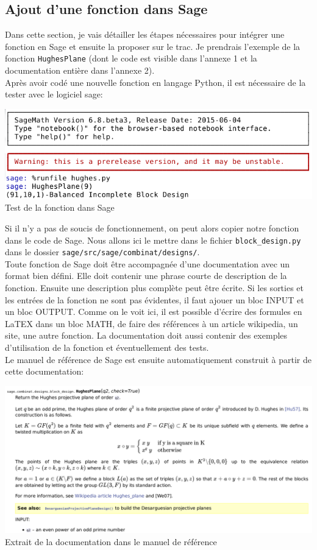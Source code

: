 \documentclass[a4paper]{article}
\begin{document}
\subsection{Ajout d'une fonction dans Sage}
Dans cette section, je vais détailler les étapes nécessaires pour intégrer une fonction en Sage et ensuite la proposer sur le trac. Je prendrais l'exemple de la fonction \texttt{HughesPlane} (dont le code est visible dans l'annexe 1 et la documentation entière dans l'annexe 2).\bigskip\\ 
Après avoir codé une nouvelle fonction en langage Python, il est nécessaire de la tester avec le logiciel sage:
\begin{center}
\includegraphics[scale=0.7]{hughessage.png}\vspace{1\baselineskip}\\
Test de la fonction dans Sage
\end{center}
\medskip
Si il n'y a pas de soucis de fonctionnement, on peut alors copier notre fonction dans le code de Sage. Nous allons ici le mettre dans le fichier \texttt{block\_design.py} dans le dossier \texttt{sage/src/sage/combinat/designs/}.\medskip\\
Toute fonction de Sage doit être accompagnée d'une documentation avec un format bien défini.
Elle doit contenir une phrase courte de description de la fonction. Ensuite une description plus complète peut être écrite. Si les sorties et les entrées de la fonction ne sont pas évidentes, il faut ajouer un bloc INPUT et un bloc OUTPUT. Comme on le voit ici, il est possible d'écrire des formules en LaTEX dans un bloc MATH, de faire des références à un article wikipedia, un site, une autre fonction. La documentation doit aussi contenir des exemples d'utilisation de la fonction et éventuellement des tests.\smallskip\\
Le manuel de référence de Sage est ensuite automatiquement construit à partir de cette documentation:
\begin{center}
  \includegraphics[scale=0.52]{hughesdocmanual.png}\\
  Extrait de la documentation dans le manuel de référence
\end{center}
\end{document}
